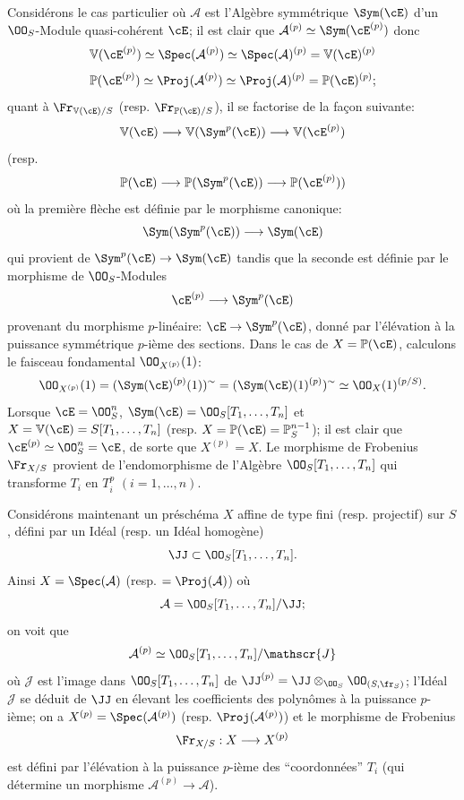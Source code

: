 Considérons le cas particulier où $\mathcal{A}$ est l'Algèbre symmétrique $\Sym(\cE)$ d'un $\OO_S$-Module quasi-cohérent $\cE$; il est clair que $\mathcal{A}^{(p)}\simeq\Sym(\cE^{(p)})$ donc
\[
\mathbb{V}(\cE^{(p)})\simeq\Spec(\mathcal{A}^{(p)})\simeq\Spec(\mathcal{A})^{(p)}=\mathbb{V}(\cE)^{(p)}
\]
\[
\mathbb{P}(\cE^{(p)})\simeq\Proj(\mathcal{A}^{(p)})\simeq\Proj(\mathcal{A})^{(p)}=\mathbb{P}(\cE)^{(p)};
\]
quant à $\Fr_{\mathbb{V}(\cE)/S}$ (resp. $\Fr_{\mathbb{P}(\cE)/S}$), il se factorise de la façon suivante:
\[
\mathbb{V}(\cE)\longrightarrow \mathbb{V}(\Sym^p(\cE))\longrightarrow \mathbb{V}(\cE^{(p)})
\]
(resp.
\[
\mathbb{P}(\cE)\longrightarrow \mathbb{P}(\Sym^p(\cE))\longrightarrow \mathbb{P}(\cE^{(p)}))
\]
où la
première flèche est définie par le morphisme canonique:
\[
\Sym(\Sym^p(\cE))\longrightarrow \Sym(\cE)
\]
qui provient de $\Sym^p(\cE)\to\Sym(\cE)$ tandis que la seconde est définie par le morphisme de $\OO_S$-Modules
\[
\cE^{(p)}\longrightarrow \Sym^p(\cE)
\]
provenant du morphisme $p$-linéaire: $\cE\to\Sym^p(\cE)$, donné par l'élévation à la puissance symmétrique $p$-ième des sections. Dans le cas de $X=\mathbb{P}(\cE)$, calculons le faisceau fondamental $\OO_{X^{(p)}}(1)$:
\[
\OO_{X^{(p)}}(1)=(\Sym(\cE)^{(p)}(1))^{\sim}
=(\Sym(\cE)(1)^{(p)})^{\sim}
\simeq \OO_X(1)^{(p/S)}.
\]
Lorsque $\cE=\OO_S^n$, $\Sym(\cE)=\OO_S[T_1,\ldots,T_n]$ et $X=\mathbb{V}(\cE)=S[T_1,\ldots,T_n]$ (resp. $X=\mathbb{P}(\cE)=\mathbb{P}_S^{n-1}$); il est clair que $\cE^{(p)}\simeq\OO_S^n=\cE$, de sorte que $X^{(p)}=X$. Le morphisme de Frobenius $\Fr_{X/S}$ provient de l'endomorphisme de l'Algèbre $\OO_S[T_1,\ldots,T_n]$ qui transforme $T_i$ en $T_i^p$ $(i=1,\ldots,n)$.

Considérons maintenant un préschéma $X$ affine de type fini (resp. projectif) sur $S$, défini par un Idéal (resp. un Idéal homogène)
\[
\JJ\subset \OO_S[T_1,\ldots,T_n].
\]
Ainsi $X=\Spec(\mathcal{A})$ (resp. $=\Proj(\mathcal{A})$) où
\[
\mathcal{A}=\OO_S[T_1,\ldots,T_n]/\JJ;
\]
on voit que
\[
\mathcal{A}^{(p)}\simeq \OO_S[T_1,\ldots,T_n]/\mathscr{J}
\]
où $\mathscr{J}$ est l'image dans $\OO_S[T_1,\ldots,T_n]$ de $\JJ^{(p)}=\JJ\otimes_{\OO_S}\OO_{(S,\fr_S)}$; l'Idéal $\mathscr{J}$ se déduit de $\JJ$ en élevant les coefficients des polynômes à la puissance $p$-ième; on a $X^{(p)}=\Spec(\mathcal{A}^{(p)})$ (resp. $\Proj(\mathcal{A}^{(p)})$) et le
morphisme de Frobenius
\[
\Fr_{X/S}:X\longrightarrow X^{(p)}
\]
est défini par l'élévation à la puissance $p$-ième des ``coordonnées'' $T_i$ (qui détermine un morphisme $\mathcal{A}^{(p)}\to\mathcal{A}$).


